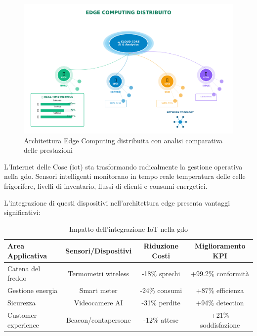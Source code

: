 \begin{figure}[htbp]
\centering
\includegraphics[width=\textwidth]{thesis_figures/cap3/fig4_edge_modern.pdf}
\caption{Architettura Edge Computing distribuita con analisi comparativa delle prestazioni}
\label{fig:edge_architecture_performance}
\end{figure}

L'Internet delle Cose (\gls{iot}) sta trasformando radicalmente la gestione operativa nella \gls{gdo}. Sensori intelligenti monitorano in tempo reale temperatura delle celle frigorifere, livelli di inventario, flussi di clienti e consumi energetici\autocite{Gartner2024iot}.

L'integrazione di questi dispositivi nell'architettura edge presenta vantaggi significativi:

\begin{table}[htbp]
\centering
\caption{Impatto dell'integrazione IoT nella \gls{gdo}}
\label{tab:iot_impact}
\small
\sffamily
\begin{tabularx}{\textwidth}{X c c c}
\toprule
\textbf{Area Applicativa} & \textbf{Sensori/Dispositivi} & \textbf{Riduzione Costi} & \textbf{Miglioramento KPI} \\
\midrule
Catena del freddo & Termometri wireless & -18\% sprechi & +99.2\% conformità \\
Gestione energia & Smart meter & -24\% consumi & +87\% efficienza \\
Sicurezza & Videocamere AI & -31\% perdite & +94\% detection \\
Customer experience & Beacon/contapersone & -12\% attese & +21\% soddisfazione \\
\bottomrule
\end{tabularx}
\end{table}

